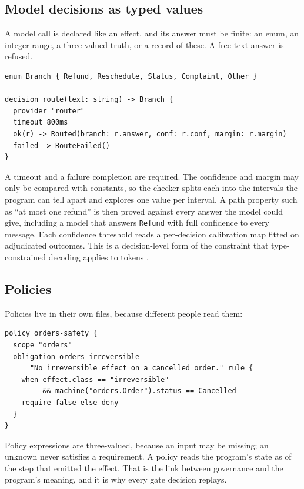 \documentclass[11pt]{article}
\begin{document}
\subsection{Model decisions as typed values}

A model call is declared like an effect, and its answer must be finite: an enum, an integer range, a three-valued truth, or a record of these. A free-text answer is refused.

\begin{lstlisting}
enum Branch { Refund, Reschedule, Status, Complaint, Other }

decision route(text: string) -> Branch {
  provider "router"
  timeout 800ms
  ok(r) -> Routed(branch: r.answer, conf: r.conf, margin: r.margin)
  failed -> RouteFailed()
}
\end{lstlisting}

A timeout and a failure completion are required. The confidence and margin may only be compared with constants, so the checker splits each into the intervals the program can tell apart and explores one value per interval. A path property such as ``at most one refund'' is then proved against every answer the model could give, including a model that answers \texttt{Refund} with full confidence to every message. Each confidence threshold reads a per-decision calibration map fitted on adjudicated outcomes. This is a decision-level form of the constraint that type-constrained decoding applies to tokens \cite{mundler2025typeconstrained}.

\subsection{Policies}

Policies live in their own files, because different people read them:

\begin{lstlisting}
policy orders-safety {
  scope "orders"
  obligation orders-irreversible
      "No irreversible effect on a cancelled order." rule {
    when effect.class == "irreversible"
         && machine("orders.Order").status == Cancelled
    require false else deny
  }
}
\end{lstlisting}

Policy expressions are three-valued, because an input may be missing; an unknown never satisfies a requirement. A policy reads the program's state as of the step that emitted the effect. That is the link between governance and the program's meaning, and it is why every gate decision replays.
\end{document}
